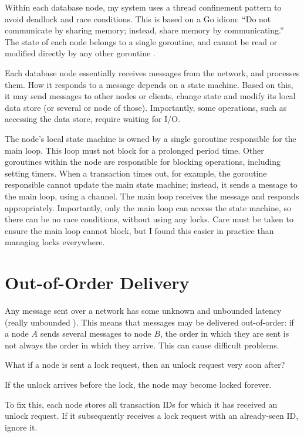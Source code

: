 \documentclass[12pt,a4paper,twoside,openright]{report}
\begin{document}
Within each database node, my system uses a thread confinement pattern to avoid deadlock and race conditions. This is based on a Go idiom: ``Do not communicate by sharing memory; instead, share memory by communicating.'' The state of each node belongs to a single goroutine, and cannot be read or modified directly by any other goroutine \cite{effective}.

Each database node essentially receives messages from the network, and processes them. How it responds to a message depends on a state machine. Based on this, it may send messages to other nodes or clients, change state and modify its local data store (or several or node of those). Importantly, some operations, such as accessing the data store, require waiting for I/O.

The node's local state machine is owned by a single goroutine responsible for the main loop. This loop must not block for a prolonged period time. Other goroutines within the node are responsible for blocking operations, including setting timers. When a transaction times out, for example, the goroutine responsible cannot update the main state machine; instead, it sends a message to the main loop, using a channel. The main loop receives the message and responds appropriately. Importantly, only the main loop can access the state machine, so there can be no race conditions, without using any locks. Care must be taken to ensure the main loop cannot block, but I found this easier in practice than managing locks everywhere.

\section{Out-of-Order Delivery}

Any message sent over a network has some unknown and unbounded latency (really unbounded \cite{imbriaco_2012}). This means that messages may be delivered out-of-order: if a node $A$ sends several messages to node $B$, the order in which they are sent is not always the order in which they arrive. This can cause difficult problems.

What if a node is sent a lock request, then an unlock request very soon after? %

If the unlock arrives before the lock, the node may become locked forever.

To fix this, each node stores all transaction IDs for which it has received an unlock request. If it subsequently receives a lock request with an already-seen ID, ignore it.
\end{document}

